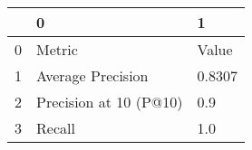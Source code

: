 \begin{tabular}{lll}
\toprule
{} &                       0 &         1 \\
\midrule
0 &                  Metric &     Value \\
1 &       Average Precision &    0.8307 \\
2 &  Precision at 10 (P@10) &       0.9 \\
3 &                  Recall &       1.0 \\
\bottomrule
\end{tabular}

